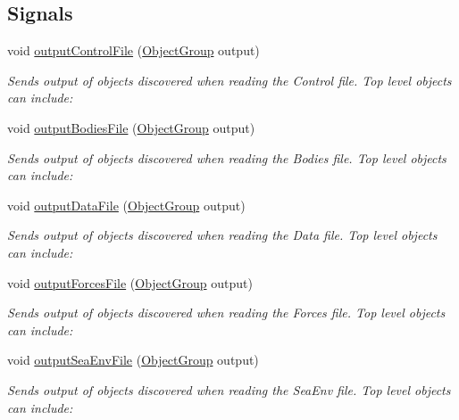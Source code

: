 \subsection*{Signals}
\begin{DoxyCompactItemize}
\item 
void \hyperlink{classosea_1_1_file_reader_a705af41cd541f983951b6988082c632c}{output\-Control\-File} (\hyperlink{classosea_1_1_object_group}{Object\-Group} output)
\begin{DoxyCompactList}\small\item\em Sends output of objects discovered when reading the Control file. Top level objects can include\-: \end{DoxyCompactList}\item 
void \hyperlink{classosea_1_1_file_reader_a79f10f1fd00fac75e83152980e34a6ea}{output\-Bodies\-File} (\hyperlink{classosea_1_1_object_group}{Object\-Group} output)
\begin{DoxyCompactList}\small\item\em Sends output of objects discovered when reading the Bodies file. Top level objects can include\-: \end{DoxyCompactList}\item 
void \hyperlink{classosea_1_1_file_reader_a7f061059a96d02e453890e3b6874c17c}{output\-Data\-File} (\hyperlink{classosea_1_1_object_group}{Object\-Group} output)
\begin{DoxyCompactList}\small\item\em Sends output of objects discovered when reading the Data file. Top level objects can include\-: \end{DoxyCompactList}\item 
void \hyperlink{classosea_1_1_file_reader_a02f58d7d0c309a7de4599d5220c3ac65}{output\-Forces\-File} (\hyperlink{classosea_1_1_object_group}{Object\-Group} output)
\begin{DoxyCompactList}\small\item\em Sends output of objects discovered when reading the Forces file. Top level objects can include\-: \end{DoxyCompactList}\item 
void \hyperlink{classosea_1_1_file_reader_a25198e57b3c7f8fbca043ecce848d008}{output\-Sea\-Env\-File} (\hyperlink{classosea_1_1_object_group}{Object\-Group} output)
\begin{DoxyCompactList}\small\item\em Sends output of objects discovered when reading the Sea\-Env file. Top level objects can include\-: \end{DoxyCompactList}\end{DoxyCompactItemize}
